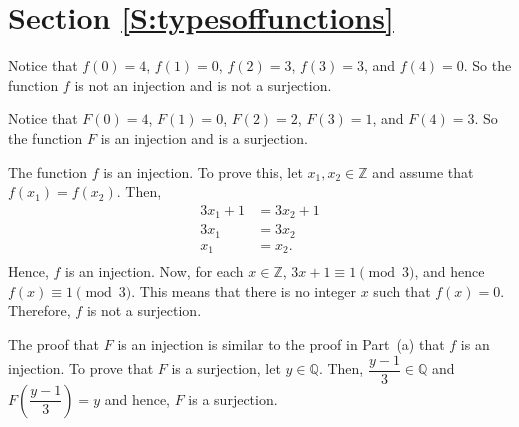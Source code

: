 \section*{Section \ref{S:typesoffunctions}}
\renewcommand{\labelenumi}{(\textbf{\alph{enumi}})}

\begin{list}{\bf{\ref{exer:sec63-mod5function}.}}
\item \begin{list}{\bf{(a)}}
\item Notice that $f(0) = 4$, $f(1) = 0$, $f(2) = 3$, $f(3) = 3$, and $f(4) = 0$.  So the function $f$ is not an injection and is not a surjection.
\end{list}
\end{list}


\begin{list}{}
\item \begin{list}{\bf{(c)}}
\item Notice that $F(0) = 4$, $F(1) = 0$, $F(2) = 2$, $F(3) = 1$, and $F(4) = 3$.  So the function $F$ is an injection and is a surjection.
\end{list}
\end{list}


\begin{list}{\bf{\ref{exer:sec63-5}.}}
\item \begin{list}{\bf{(a)}}
\item The function $f$ is an injection.  To prove this, let $x_1, x_2 \in \mathbb{Z}$ and assume that $f ( x_1 ) = f ( x_2 )$.  Then,
\begin{align*}
3x_1 + 1 &= 3x_2 + 1 \\
    3x_1 &= 3x_2 \\
     x_1 &= x_2. \\
\end{align*}
Hence, $f$ is an injection.  Now, for each $x \in \mathbb{Z}$, $3x + 1 \equiv 1 \pmod 3$, and hence 
$f ( x ) \equiv 1 \pmod 3$.  This means that there is no integer $x$ such that 
$f ( x ) = 0$.  Therefore, $f$ is not a surjection.
\end{list}
\end{list}

\begin{list}{}
\item \begin{list}{\bf{(b)}}
\item The proof that $F$ is an injection is similar to the proof in Part~(a) that $f$ is an injection.  To prove that $F$ is a surjection, let $y \in \mathbb{Q}$.  Then, 
$\dfrac{y-1}{3} \in \mathbb{Q}$ and $F \left( \dfrac{y-1}{3} \right) = y$ and hence, $F$ is a surjection.
\end{list}
\end{list}

